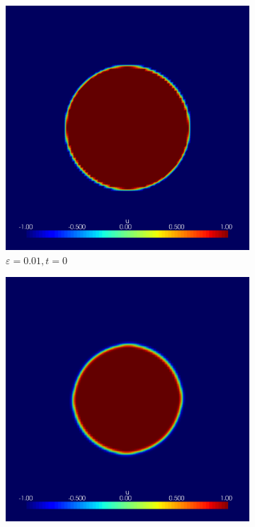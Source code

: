 \begin{figure}[h]
	\begin{subfigure}[b]{0.3\linewidth}
		\includegraphics[width=\linewidth]{numerical_simulation/bump/eps_0.01000000.vtu}
		\caption{$ \varepsilon = 0.01, t = 0 $}
	\end{subfigure}
	\hfill
	\begin{subfigure}[b]{0.3\linewidth}
		\includegraphics[width=\linewidth]{numerical_simulation/bump/eps_0.01000015.vtu}

\end{subfigure}
\end{figure}
